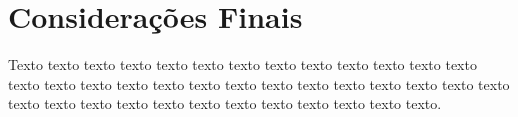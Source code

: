 \chapter{Considerações Finais}

Texto texto texto texto texto texto texto texto texto texto texto texto texto texto texto texto texto texto texto texto texto texto texto texto texto texto texto texto texto texto texto texto texto texto texto texto texto texto texto.
